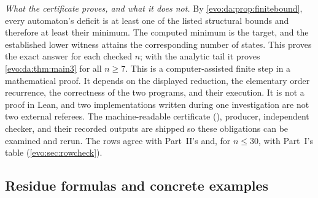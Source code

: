 \documentclass[11pt,a4paper]{article}
\numberwithin{equation}{section}
\theoremstyle{definition}
\theoremstyle{remark}
\begin{document}
\emph{What the certificate proves, and what it does not.} By
\cref{evo:da:prop:finitebound}, every automaton's deficit is at least one of
the listed structural bounds and therefore at least their minimum. The
computed minimum is the target, and the established lower witness attains the
corresponding number of states. This proves the exact answer for each checked
$n$; with the analytic tail it proves \cref{evo:da:thm:main3} for all $n\ge7$.
This is a computer-assisted finite step in a mathematical proof. It depends on
the displayed reduction, the elementary order recurrence, the correctness of
the two programs, and their execution. It is not a proof in Lean, and two
implementations written during one investigation are not two external
referees. The machine-readable certificate
(), producer,
independent checker, and their recorded outputs are shipped so these
obligations can be examined and rerun. The rows agree with Part~II's
 and, for $n\le30$, with
Part~I's table (\cref{evo:sec:rowcheck}).

\subsection{Residue formulas and concrete examples}
\end{document}
